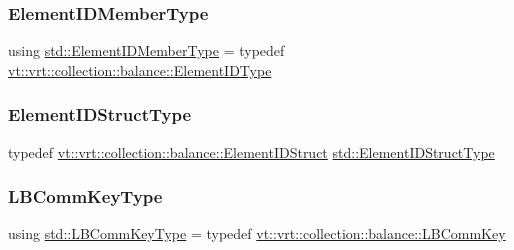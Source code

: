 \mbox{\label{namespacestd_a3cd9aec8ec8ce32b482297c691c903e8}} 
\subsubsection{\texorpdfstring{Element\+I\+D\+Member\+Type}{ElementIDMemberType}}
{\footnotesize\ttfamily using \hyperlink{namespacestd_a3cd9aec8ec8ce32b482297c691c903e8}{std\+::\+Element\+I\+D\+Member\+Type} = typedef \hyperlink{namespacevt_1_1vrt_1_1collection_1_1balance_a14c8d2c972f2913aa3f1636e5be0a120}{vt\+::vrt\+::collection\+::balance\+::\+Element\+I\+D\+Type}}

\mbox{\label{namespacestd_af20b73e88e055920f8203d35581f5a84}} 
\subsubsection{\texorpdfstring{Element\+I\+D\+Struct\+Type}{ElementIDStructType}}
{\footnotesize\ttfamily typedef \hyperlink{structvt_1_1vrt_1_1collection_1_1balance_1_1_element_i_d_struct}{vt\+::vrt\+::collection\+::balance\+::\+Element\+I\+D\+Struct} \hyperlink{namespacestd_af20b73e88e055920f8203d35581f5a84}{std\+::\+Element\+I\+D\+Struct\+Type}}

\mbox{\label{namespacestd_a3a6802ab62d3595b44a8463f8e654c31}} 
\subsubsection{\texorpdfstring{L\+B\+Comm\+Key\+Type}{LBCommKeyType}}
{\footnotesize\ttfamily using \hyperlink{namespacestd_a3a6802ab62d3595b44a8463f8e654c31}{std\+::\+L\+B\+Comm\+Key\+Type} = typedef \hyperlink{structvt_1_1vrt_1_1collection_1_1balance_1_1_l_b_comm_key}{vt\+::vrt\+::collection\+::balance\+::\+L\+B\+Comm\+Key}}

\mbox{\label{namespacestd_ae3c14c256fabd8bbed83c439b367c3d8}} 
